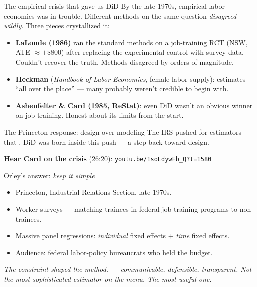 \documentclass[aspectratio=169,11pt]{beamer}
\begin{document}
\begin{frame}{The empirical crisis that gave us DiD}
\vspace{-0.4em}
\footnotesize
By the late 1970s, empirical labor economics was in trouble. Different methods on the same question \textit{disagreed wildly}. Three pieces crystallized it:
\begin{itemize}
  \item \textbf{LaLonde (1986)} ran the standard methods on a job-training RCT (NSW, ATE $\approx +\$800$) after replacing the experimental control with survey data. Couldn't recover the truth. Methods disagreed by orders of magnitude.
  \item \textbf{Heckman} (\textit{Handbook of Labor Economics}, female labor supply): estimates ``all over the place'' --- many probably weren't credible to begin with.
  \item \textbf{Ashenfelter \& Card (1985, ReStat)}: even DiD wasn't an obvious winner on job training. Honest about its limits from the start.
\end{itemize}
\begin{block}{The Princeton response: design over modeling}
The IRS pushed for estimators that . DiD was born inside this push --- a step back toward design.
\end{block}
\textbf{Hear Card on the crisis} (26:20): \href{https://youtu.be/1soLdywFb_Q?si=BCVqYeRz6jYiwHTQ&t=1580}{\color{ocean}\texttt{youtu.be/1soLdywFb\_Q?t=1580}}
\end{frame}

\begin{frame}{Orley's answer: \textit{keep it simple}}
\vspace{0.4em}
\begin{itemize}
  \item Princeton, Industrial Relations Section, late 1970s.
  \item Worker surveys --- matching trainees in federal job-training programs to non-trainees.
  \item Massive panel regressions: \textit{individual} fixed effects $+$ \textit{time} fixed effects.
  \item Audience: federal labor-policy bureaucrats who held the budget.
\end{itemize}
\vspace{0.5em}
\vspace{0.3em}
\begin{center}
\small\color{warmgray}\itshape
The constraint shaped the method. \; --- communicable, defensible, transparent. \;Not the most sophisticated estimator on the menu. \;The most useful one.
\end{center}
\end{frame}
\end{document}
